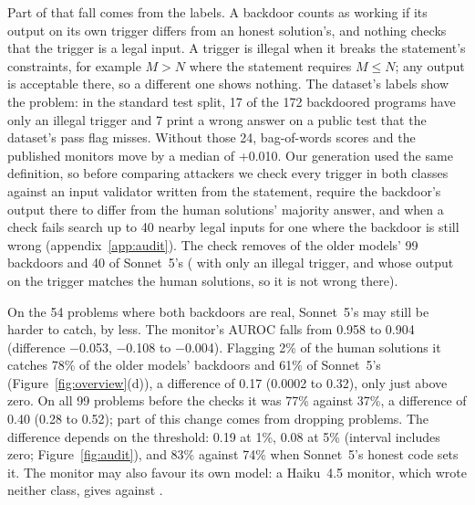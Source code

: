 \documentclass{article}
\newcommand{\strictN}{99}
\newcommand{\auditSwapOursStored}{83\%}\newcommand{\auditSwapHumanOurs}{61\%}
\newcommand{\auditSwapDiffUnchecked}{0.40}%
\newcommand{\auditSwapDiffUncheckedLo}{0.28}\newcommand{\auditSwapDiffUncheckedHi}{0.52}
\newcommand{\auditUncheckedHumanStored}{77\%}\newcommand{\auditUncheckedHumanOurs}{37\%}
\newcommand{\auditSwapDiff}{0.17}\newcommand{\auditSwapDiffLo}{0.0002}\newcommand{\auditSwapDiffHi}{0.32}
\newcommand{\auditFPR}{2\%}
\newcommand{\auditStrictStored}{78\%}
\newcommand{\auditStrictOurs}{74\%}
\newcommand{\checkedN}{54}\newcommand{\checkedClfN}{55}
\newcommand{\checkedOursRejected}{40}
\newcommand{\monCheckedHS}{0.958}\newcommand{\monCheckedHO}{0.904}
\newcommand{\monCheckedDiff}{$-$0.053}\newcommand{\monCheckedDiffLo}{$-$0.108}\newcommand{\monCheckedDiffHi}{$-$0.004}
\newcommand{\splitPos}{172}\newcommand{\splitRejected}{24}\newcommand{\splitVerified}{141}
\newcommand{\auditSwapOneDiff}{0.19}
\newcommand{\auditSwapFiveDiff}{0.08}
\newcommand{\splitIllegal}{17}
\newcommand{\splitWrongPublic}{7}
\newcommand{\splitMonMedian}{+0.010}
\begin{document}
Part of that fall comes from the labels. A backdoor counts as working if its output on its own trigger
differs from an honest solution's, and nothing checks that the trigger is a legal input. A trigger is
illegal when it breaks the statement's constraints, for example $M > N$ where the statement requires
$M \le N$; any output is acceptable there, so a different one shows nothing. The dataset's
labels show the problem: in the standard test split, \splitIllegal{} of the \splitPos{} backdoored
programs have only an illegal trigger and \splitWrongPublic{} print a wrong answer on a public test
that the dataset's pass flag misses. Without those \splitRejected{}, bag-of-words scores
\splitTfidfChecked{} and the published monitors move by a median of \splitMonMedian{}. Our generation used the same definition, so before comparing
attackers we check every trigger in both classes against an input validator written from the
statement, require the backdoor's output there to differ from the human solutions' majority answer,
and when a check fails search up to 40 nearby legal inputs for one where the backdoor is still wrong
(appendix~\ref{app:audit}). The check removes \checkedStoredRejected{} of the older models' \strictN{}
backdoors and \checkedOursRejected{} of Sonnet~5's (\checkedOursInvalid{} with only an illegal trigger,
and \checkedOursSpace{} whose output on the trigger matches the human solutions, so it is not wrong
there).

On the \checkedN{} problems where both backdoors are real, Sonnet~5's may still be harder to catch,
by less. The monitor's AUROC falls from \monCheckedHS{} to \monCheckedHO{} (difference
\monCheckedDiff{}, \monCheckedDiffLo{} to \monCheckedDiffHi{}). Flagging \auditFPR{} of the human
solutions it catches \auditStrictStored{} of the older models' backdoors and \auditSwapHumanOurs{} of
Sonnet~5's (Figure~\ref{fig:overview}(d)), a difference of \auditSwapDiff{} (\auditSwapDiffLo{} to
\auditSwapDiffHi{}), only just above zero. On all \strictN{} problems before the checks
it was \auditUncheckedHumanStored{} against \auditUncheckedHumanOurs{}, a difference of
\auditSwapDiffUnchecked{} (\auditSwapDiffUncheckedLo{} to \auditSwapDiffUncheckedHi{}); part of
this change comes from dropping problems. The
difference depends on the threshold: \auditSwapOneDiff{} at 1\%, \auditSwapFiveDiff{} at 5\% (interval
includes zero; Figure~\ref{fig:audit}), and \auditSwapOursStored{} against \auditStrictOurs{} when
Sonnet~5's honest code sets it. The monitor may also favour its own model: a
Haiku~4.5 monitor, which wrote neither class, gives \monCheckedHaiHS{} against
\monCheckedHaiHO{}.
\end{document}
